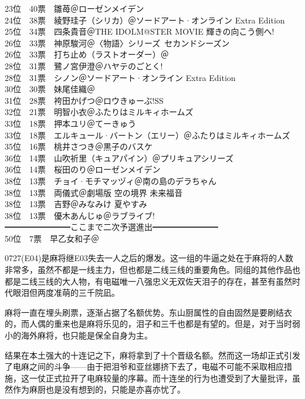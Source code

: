 {    23位　40票　雛苺＠ローゼンメイデン\\
    24位　38票　綾野珪子（シリカ）＠ソードアート·オンライン Extra Edition\\
    25位　34票　四条貴音＠THE IDOLM@STER MOVIE 輝きの向こう側へ!\\
    26位　33票　神原駿河＠〈物語〉シリーズ~セカンドシーズン\\
    26位　33票　打ち止め（ラストオーダー）＠\Railgan\\
    28位　31票　鷺ノ宮伊澄＠ハヤテのごとく!\\
    28位　31票　シノン＠ソードアート·オンライン Extra Edition\\
    30位　30票　妹尾佳織＠\Saki\\
    31位　28票　袴田かげつ＠ロウきゅーぶ!SS\\
    32位　21票　明智小衣＠ふたりはミルキィホームズ\\
    33位　18票　押本ユリ＠てーきゅう\\
    33位　18票　エルキュール·バートン（エリー）＠ふたりはミルキィホームズ\\
    35位　16票　桃井さつき＠黒子のバスケ\\
    36位　14票　山吹祈里（キュアパイン）＠プリキュアシリーズ\\
    36位　14票　桜田のり＠ローゼンメイデン\\
    38位　13票　チョイ·モチマッヅィ＠南の島のデラちゃん\\
    38位　13票　両儀式＠劇場版 空の境界 未来福音\\
    38位　13票　吉野＠みなみけ 夏やすみ\\
    38位　13票　優木あんじゅ＠ラブライブ!\\
    ━━━━━━━━ここまで二次予選進出━━━━━━━━\\
    50位　7票　早乙女和子＠\Madomagi
}

0727(E04)是麻将继E03失去一人之后的爆发。这一组的牛逼之处在于麻将的人数非常多，虽然不都是一线主力，但也都是二线三线的重要角色。同组的其他作品也都是二线三线的大人物，有电磁唯一八强忠义无双佐天泪子的存在，甚至有虽然时代眼泪但两度准萌的三千院凪。

麻将一直在埋头刷票，逐渐占据了名额优势。东山厨属性的自由固然是要刷结衣的，而人偶的重来也是麻将乐见的，泪子和三千也都是有望的。但是，对于当时弱小的海外麻将，也只能是保全自身为主。

结果在本土强大的十连记之下，麻将拿到了十个晋级名额。然而这一场却正式引发了电麻之间的斗争——由于把泪爷和亚丝娜挤下去了，电磁不可能不采取相应措施，这一仗正式拉开了电麻较量的序幕。而十连坐的行为也遭受到了大量批评，虽然作为麻厨也是没有想到的，只能是亦喜亦忧了。

